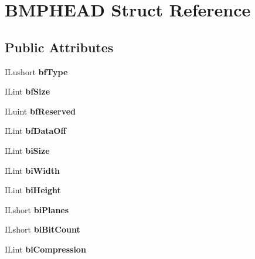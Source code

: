 \hypertarget{structBMPHEAD}{}\section{B\+M\+P\+H\+E\+AD Struct Reference}
\label{structBMPHEAD}
\subsection*{Public Attributes}
\begin{DoxyCompactItemize}
\item 
\mbox{\label{structBMPHEAD_a68f8e3eb84a81923e588a1889fbb521e}} 
I\+Lushort {\bfseries bf\+Type}
\item 
\mbox{\label{structBMPHEAD_abb8b08511cdf3f961b3a0fd03fdf108c}} 
I\+Lint {\bfseries bf\+Size}
\item 
\mbox{\label{structBMPHEAD_ad81310642656bfbec964c073f7c781e6}} 
I\+Luint {\bfseries bf\+Reserved}
\item 
\mbox{\label{structBMPHEAD_a8078d1f0d2bfb47c8b2c9e8d95476c1d}} 
I\+Lint {\bfseries bf\+Data\+Off}
\item 
\mbox{\label{structBMPHEAD_a1a0c5dd3f4f0baa0e02d84143616291f}} 
I\+Lint {\bfseries bi\+Size}
\item 
\mbox{\label{structBMPHEAD_adf4b25aff39d30c14447f7996c409440}} 
I\+Lint {\bfseries bi\+Width}
\item 
\mbox{\label{structBMPHEAD_ab68ebbdfdf18f58bcb57d8591b09ddce}} 
I\+Lint {\bfseries bi\+Height}
\item 
\mbox{\label{structBMPHEAD_a8f361d976cb39d5c98efe381ce6b4382}} 
I\+Lshort {\bfseries bi\+Planes}
\item 
\mbox{\label{structBMPHEAD_ab3b7477ef101c58d586772a0390ce06d}} 
I\+Lshort {\bfseries bi\+Bit\+Count}
\item 
\mbox{\label{structBMPHEAD_a8d0fb04b1a551a68cbd114ed04965c3c}} 
I\+Lint {\bfseries bi\+Compression}

\end{DoxyCompactItemize}
